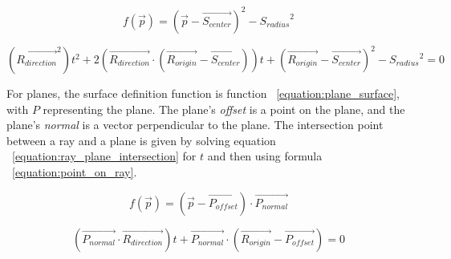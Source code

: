 \documentclass[11pt]{article}
\newcommand{\rayorg}{\vec{R_{origin}}}
\newcommand{\raydir}{\vec{R_{direction}}}
\begin{document}
\begin{equation}
  \label{equation:sphere_surface}
  f(\vec{p}) = (\vec{p} - \vec{S_{center}})^2 - {S_{radius}}^2
\end{equation}

\begin{equation}
  \label{equation:ray_sphere_intersection}
  (\raydir^2)t^2 + 2(\raydir \cdot (\rayorg - \vec{S_{center}}))t + (\rayorg - \vec{S_{center}})^2 - {S_{radius}}^2 = 0
\end{equation}

For planes, the surface definition function is function ~\ref{equation:plane_surface}, with $P$ representing the plane.
The plane's {\it offset} is a point on the plane, and the plane's {\it normal} is a vector perpendicular to the plane.
The intersection point between a ray and a plane is given by solving equation ~\ref{equation:ray_plane_intersection} for $t$ and then using formula ~\ref{equation:point_on_ray}.

\begin{equation}
  \label{equation:plane_surface}
  f(\vec{p}) = (\vec{p} - \vec{P_{offset}}) \cdot \vec{P_{normal}}
\end{equation}

\begin{equation}
  \label{equation:ray_plane_intersection}
  (\vec{P_{normal}} \cdot \raydir)t + \vec{P_{normal}} \cdot (\rayorg - \vec{P_{offset}}) = 0
\end{equation}
\end{document}

